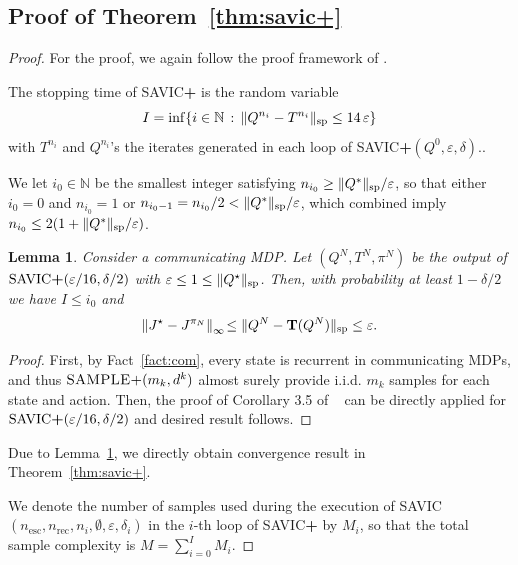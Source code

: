 \documentclass{article}
\newtheorem{lemma}[theorem]{Lemma}
\theoremstyle{definition}
\theoremstyle{remark}
\newcommand{\T}{\mathbf{T}}
\newcommand{\NN}{\mathbb{N}}
\newcommand*{\infn}[1]{\left\|{#1}\right\|_{\infty}}
\renewcommand{\sp}[1]{\|{#1}\|_\text{\rm sp}}
\begin{document}
\subsection{Proof of Theorem~\ref{thm:savic+}}
\begin{proof}
For the proof, we again follow the proof framework of \cite{lee2025near}.

The stopping time of \mbox{\rm SAVIC\textbf{+}} is the random variable 
\begin{equation*}
 I =\inf\{ i \in \mathbb N \,:\, \sp{Q^{n_i}-T^{n_i}} \le 14\,\varepsilon\}
\end{equation*}
with $T^{n_i}$ and $Q^{n_i}$'s the iterates generated in each loop of \mbox{\rm SAVIC\textbf{+}}$(Q^0,\varepsilon,\delta)$..

    We let $i_0 \in \NN$ be the smallest integer satisfying $n_{i_0}\ge\sp{Q^{*}}/\varepsilon$, so that 
either $i_0=0$ and $n_{i_0}=1$ or $n_{i_0-1}=n_{i_0}/2<\sp{Q^{*}}/\varepsilon$, which combined imply $n_{i_0}\le 2(1+\sp{Q^{*}}/\varepsilon)$.
\begin{lemma}\label{lem:savic+}
Consider a communicating MDP. Let $(Q^{N},T^{N},\pi^{N})$ be the output of $\mbox{\sc \mbox{\rm SAVIC\textbf{+}}}(\varepsilon/16,\delta/2)$ with $\varepsilon \le 1 \le \sp{Q^\star}$. Then, with probability at least $1-\delta/2$ we have $I \le i_0$ and
\vspace{-1ex}
\begin{equation*}
\infn{J^\star-J^{\pi_{N}}}\! \leq \sp{Q^N-\T(Q^N)}\leq \varepsilon.
\end{equation*}
\end{lemma}
\begin{proof}
    First, by Fact~\ref{fact:com}, every state is recurrent in communicating MDPs, and thus $\mbox{\sc SAMPLE+}( m_k, d^k)$ almost surely provide i.i.d. $m_k$ samples for each state and action. Then, the proof of Corollary 3.5 of ~\cite{lee2025near}  can be directly applied for  $\mbox{\sc \mbox{\rm SAVIC\textbf{+}}}(\varepsilon/16,\delta/2)$ and desired result follows. 
\end{proof}
    Due to Lemma~\ref{lem:savic+}, we directly obtain convergence result in Theorem~\ref{thm:savic+}. 
    
 We denote the number of  samples used during  the execution of \mbox{\sc\mbox{SAVIC}}$( n_{\mathrm{esc}},n_{\mathrm{rec}}, n_i, \emptyset, \varepsilon, \delta_i)$ in the $i$-th loop of  \mbox{\rm SAVIC\textbf{+}}  by $M_i$, so that the total sample complexity is $M=\sum^{I}_{i=0}M_i$. 


\end{proof}
\end{document}
